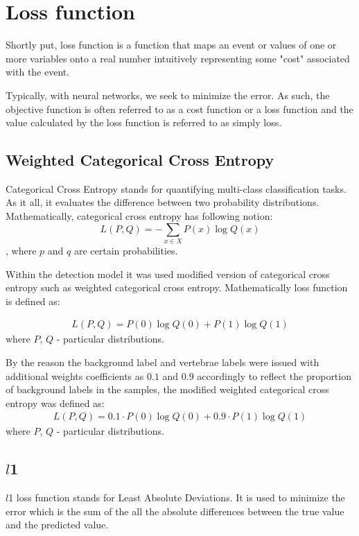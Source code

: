 \section{Loss function}
Shortly put, loss function is a function that maps an event or values of one or more variables onto a real number intuitively representing some "cost" associated with the event. 

Typically, with neural networks, we seek to minimize the error. As such, the objective function is often referred to as a cost function or a loss function and the value calculated by the loss function is referred to as simply loss.

\subsection{Weighted Categorical Cross Entropy}
Categorical Cross Entropy stands for quantifying multi-class classification tasks. As it all, it evaluates the difference between two probability distributions. Mathematically, categorical cross entropy has following notion: 
\[
L(P, Q) = - \sum_{x \in X} P(x) \log Q(x) \], where $p$ and $q$ are certain probabilities. 

Within the detection model it was used modified version of categorical cross entropy such as weighted categorical cross entropy. Mathematically loss function is defined as:

\begin{align*}
 L(P, Q) = P(0)\log Q(0) + P(1)\log Q(1)
\end{align*}
where $P$, $Q$ - particular distributions. 

By the reason the background label and vertebrae labels were issued with additional weights coefficients as $0.1$ and $0.9$ accordingly to reflect the proportion of background labels in the samples, the modified weighted categorical cross entropy was defined as:
\begin{align*}
 L(P, Q) = 0.1 \cdot P(0)\log Q(0) + 0.9 \cdot P(1)\log Q(1)
\end{align*}
where $P$, $Q$ - particular distributions.  

\subsection{$l$1}
$l$1 loss function stands for Least Absolute Deviations. It is used to minimize the error which is the sum of the all the absolute differences between the true value and the predicted value.

